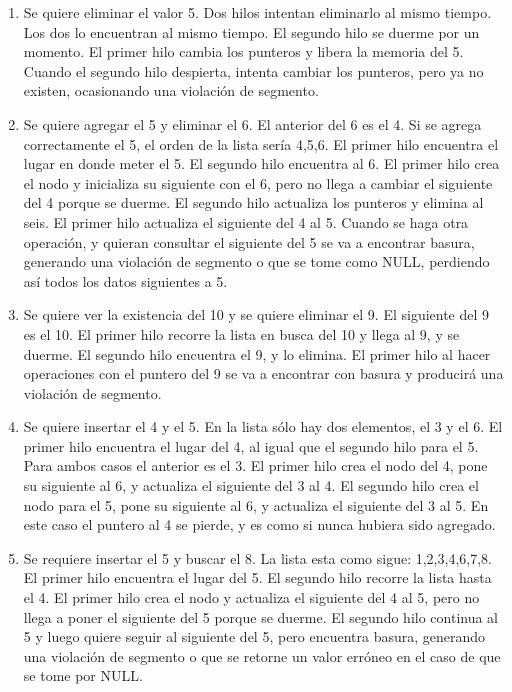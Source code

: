 \documentclass[a4paper,12pt]{article}
\begin{document}
\begin{enumerate}
\begin{enumerate}
 \item Se quiere eliminar el valor 5. Dos hilos intentan eliminarlo al mismo tiempo. Los dos lo encuentran al mismo tiempo.
 El segundo hilo se duerme por un momento. El primer hilo cambia los punteros y libera la memoria del 5. Cuando el segundo hilo
 despierta, intenta cambiar los punteros, pero ya no existen, ocasionando una violación de segmento.
 \item Se quiere agregar el 5 y eliminar el 6. El anterior del 6 es el 4. Si se agrega correctamente el 5, el orden de la lista
 sería 4,5,6. El primer hilo encuentra el lugar en donde meter el 5. El segundo hilo encuentra al 6. El primer hilo crea el nodo
 y inicializa su siguiente con el 6, pero no llega a cambiar el siguiente del 4 porque se duerme. El segundo hilo actualiza los
 punteros y elimina al seis. El primer hilo actualiza el siguiente del 4 al 5. Cuando se haga otra operación, y quieran consultar
 el siguiente del 5 se va a encontrar basura, generando una violación de segmento o que se tome como NULL, perdiendo así todos los
 datos siguientes a 5.
 \item Se quiere ver la existencia del 10 y se quiere eliminar el 9. El siguiente del 9 es el 10. El primer hilo recorre la lista en
 busca del 10 y llega al 9, y se duerme. El segundo hilo encuentra el 9, y lo elimina. El primer hilo al hacer operaciones con
 el puntero del 9 se va a encontrar con basura y producirá una violación de segmento.
 \item Se quiere insertar el 4 y el 5. En la lista sólo hay dos elementos, el 3 y el 6. El primer hilo encuentra el lugar del 4, al
 igual que el segundo hilo para el 5. Para ambos casos el anterior es el 3. El primer hilo crea el nodo del 4, pone su siguiente al 6,
 y actualiza el siguiente del 3 al 4. El segundo hilo crea el nodo para el 5, pone su siguiente al 6, y actualiza 
 el siguiente del 3 al 5. En este caso el puntero al 4 se pierde, y es como si nunca hubiera sido agregado.
 \item Se requiere insertar el 5 y buscar el 8. La lista esta como sigue: 1,2,3,4,6,7,8. El primer hilo encuentra el lugar del 5.
 El segundo hilo recorre la lista hasta el 4. El primer hilo crea el nodo y actualiza el siguiente del 4 al 5, pero no llega a poner
 el siguiente del 5 porque se duerme. El segundo hilo continua al 5 y luego quiere seguir al siguiente del 5, pero encuentra basura,
 generando una violación de segmento o que se retorne un valor erróneo en el caso de que se tome por NULL.
\end{enumerate}


\end{enumerate}
\end{document}
